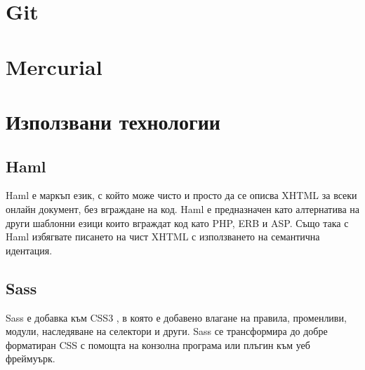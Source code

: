 \documentclass[a4paper]{article}
\begin{document}

\section{Git}

\section{Mercurial}


\section{Използвани технологии}

  \subsection{Haml}
  Haml е \cite{haml} маркъп език, с който може чисто и просто да се описва XHTML за всеки онлайн документ, без вграждане на код. Haml е предназначен като алтернатива на други шаблонни езици които вграждат код като PHP, ERB и ASP. Също така с Haml избягвате писането на чист XHTML с използването на семантична идентация.

  \subsection{Sass}
  Sass \cite{sass} е добавка към CSS3 \cite{css}, в която е добавено влагане на правила, променливи, модули, наследяване на селектори и други. Sass се трансформира до добре форматиран CSS с помощта на конзолна програма или плъгин към уеб фреймуърк.
\end{document}
